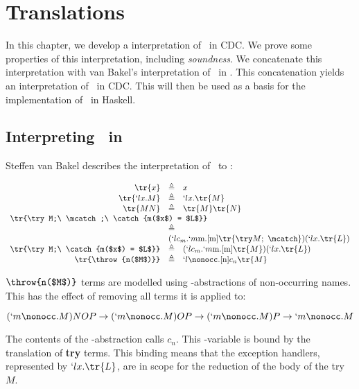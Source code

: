 \chapter{Translations}


In this chapter, we develop a interpretation of \lmu\ in CDC.
We prove some properties of this interpretation, including \emph{soundness}.
We concatenate this interpretation with van Bakel's interpretation of \ltry\ in \lmu.
This concatenation yields an interpretation of \ltry\ in CDC.
This will then be used as a basis for the implementation of \ltry\ in Haskell.

\section{Interpreting \ltry\ in \lmu}

Steffen van Bakel describes the interpretation of \ltry\ to \lmu:

\[
  \begin{array}{rcl}
    \tr{x} &\triangleq& x \\
    \tr{`lx.M} &\triangleq& `lx.\tr{M} \\
    \tr{M N} &\triangleq& \tr{M}\tr{N} \\
    \multicolumn{3}{l}{\tr{\try M;\ \mcatch;\ \catch{m($x$) = $L$}}} \\
    & \triangleq & \\
    &\multicolumn{2}{l}{ (`lc_m.`m\text{m}.[\text{m}]\tr{\try M;\ \mcatch})(`lx.\tr{L})} \\
    
    \tr{\try M;\ \catch{m($x$) = $L$}} & \triangleq & (`lc_m.`m\text{m}.[\text{m}]\tr{M})(`lx.\tr{L}) \\
    \tr{\throw{n($M$)}} &\triangleq& `l\nonocc.[\text{n}]c_n\tr{M}
  \end{array}
\]

$\throw{n($M$)}$ terms are modelled using \lmu-abstractions of non-occurring names. This has the effect of removing all terms it is applied to:

\[
  (`m\nonocc.M)NOP \to (`m\nonocc.M)OP \to (`m\nonocc.M)P \to `m\nonocc.M
\]

The contents of the \lmu-abstraction calls $c_n$.
This \lam-variable is bound by the translation of \textbf{try} terms.
This binding means that the exception handlers, represented by $`lx.\tr{L}$,
are in scope for the reduction of the body of the try $M$.

